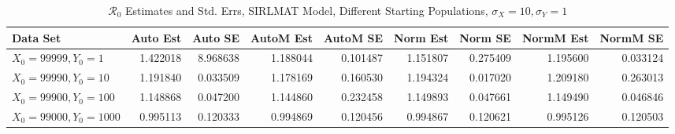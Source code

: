 \documentclass[12pt]{article}
\newcommand{\rr}{\ensuremath{\mathcal{R}_0}}
\begin{document}
\begin{table}[H]
	
	\caption{$\rr$ Estimates and Std. Errs, SIRLMAT Model,
		Different Starting Populations, 
		$\sigma_X = 10, \sigma_Y = 1$}
	\begin{footnotesize}
		\hskip -1.7cm
		\begin{tabular}{l|r|r|r|r|r|r|r|r}
			\hline
			Data Set & Auto Est & Auto SE & AutoM Est & AutoM SE & Norm Est & Norm SE & NormM Est & NormM SE\\
			\hline
			$X_0 = 99999, Y_0 = 1$ & 1.422018 & 8.968638 & 1.188044 & 0.101487 & 1.151807 & 0.275409 & 1.195600 & 0.033124\\
			\hline
			$X_0 = 99990, Y_0 = 10$ & 1.191840 & 0.033509 & 1.178169 & 0.160530 & 1.194324 & 0.017020 & 1.209180 & 0.263013\\
			\hline
			$X_0 = 99900, Y_0 = 100$ & 1.148868 & 0.047200 & 1.144860 & 0.232458 & 1.149893 & 0.047661 & 1.149490 & 0.046846\\
			\hline
			$X_0 = 99000, Y_0 = 1000$ & 0.995113 & 0.120333 & 0.994869 & 0.120456 & 0.994867 & 0.120621 & 0.995126 & 0.120503\\
			\hline
		\end{tabular}
	\end{footnotesize}
\end{table}
\end{document}
